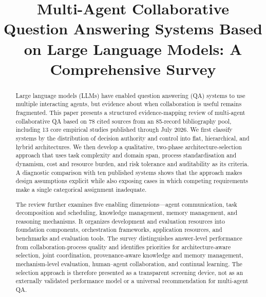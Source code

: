 \documentclass[a4paper,fleqn]{cas-dc}
\begin{document}
\let\WriteBookmarks\relax
\renewcommand{\printorcid}{}
\def\floatpagepagefraction{1}
\def\textpagefraction{.001}



\title[mode=title]{%
  Multi-Agent Collaborative Question Answering Systems Based on Large Language
  Models: A Comprehensive Survey}

\begin{abstract}
Large language models (LLMs) have enabled question answering (QA) systems to
use multiple interacting agents, but evidence about when collaboration is
useful remains fragmented. This paper presents a structured evidence-mapping
review of multi-agent collaborative QA based on 78 cited sources from an
85-record bibliography pool, including 13 core empirical studies
published through July 2026. We first
classify systems by the distribution of decision authority and control into
flat, hierarchical, and hybrid architectures. We then develop a qualitative,
two-phase architecture-selection approach that uses task complexity and
domain span, process standardisation and dynamism, cost and resource burden,
and risk tolerance and auditability as its criteria. A diagnostic comparison
with ten published systems shows that the approach makes design assumptions
explicit while also exposing cases in which competing requirements make a
single categorical assignment inadequate.

The review further examines five enabling dimensions---agent communication,
task decomposition and scheduling, knowledge management, memory management,
and reasoning mechanisms. It organizes development and evaluation resources
into foundation components, orchestration frameworks, application resources,
and benchmarks and evaluation tools. The survey distinguishes answer-level
performance from collaboration-process quality and identifies priorities for
architecture-aware selection, joint coordination, provenance-aware knowledge
and memory management, mechanism-level evaluation, human--agent collaboration,
and continual learning. The selection approach is therefore
presented as a transparent screening device, not as an externally validated
performance model or a universal recommendation for multi-agent QA.
\end{abstract}
\end{document}
